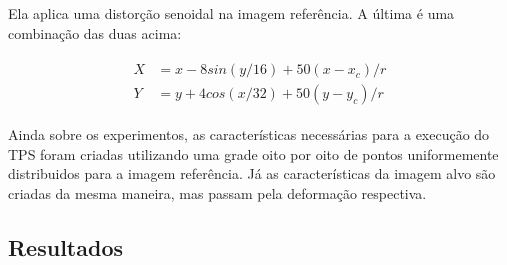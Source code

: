 \documentclass[]{spie}  %
\begin{document}
Ela aplica uma distorção senoidal na imagem referência. A última é uma combinação das duas acima:

\begin{align}
\begin{split}
	X &= x-8sin(y/16) + 50(x-x_c)/r \\
	Y &= y+4cos(x/32) + 50(y-y_c)/r
\end{split} 
\end{align}

	Ainda sobre os experimentos, as características necessárias para a execução do TPS foram criadas
utilizando uma grade oito por oito de pontos uniformemente distribuidos para a imagem referência. Já as
características da imagem alvo são criadas da mesma maneira, mas passam pela deformação respectiva.

\subsection{Resultados}
\end{document}
